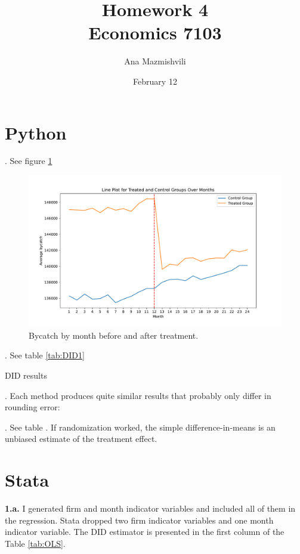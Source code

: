 \documentclass{article}
\title{Homework 4 \\ Economics 7103}
\author{Ana Mazmishvili}
\date{February 12}
\begin{document}
  
\maketitle

\section{Python}

. See figure \ref{fig:trend}

\begin{figure}[h]
    \centering
    \includegraphics{homework 4/output/figure/trend1.pdf}
    \caption{ Bycatch by month before and after treatment. }
    \label{fig:trend}
\end{figure}

. See table \ref{tab:DID1}

\begin{table}[]
    \centering
    
    \caption{DID results}
    \label{tab:DID1}
\end{table}


. Each method produces quite similar results that probably only differ in rounding error:


. See table .  If randomization worked, the simple difference-in-means is an unbiased estimate of the treatment effect.

\section{Stata}

\noindent \textbf{1.a.} I generated firm and month indicator variables and included all of them in the regression. Stata dropped two firm indicator variables and one month indicator variable. The DID estimator is presented in the first column of the Table \ref{tab:OLS}. \\
\end{document}
